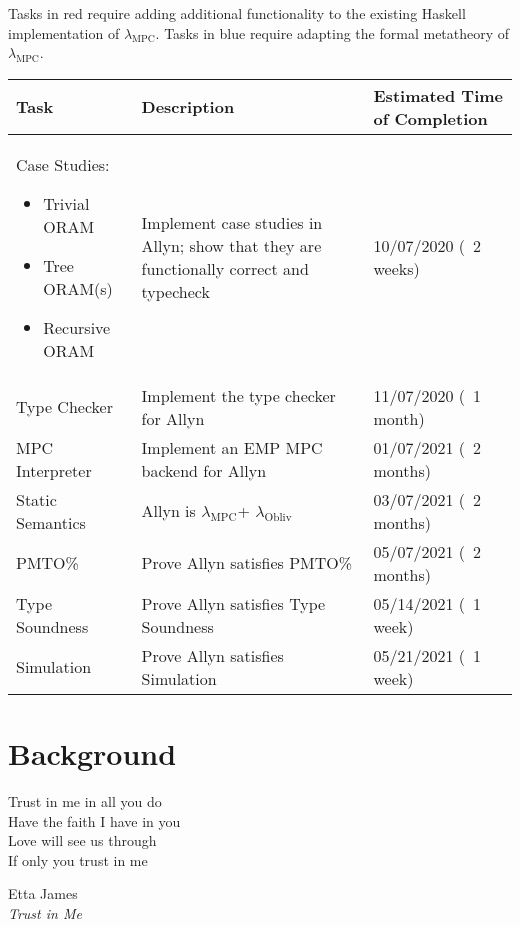 \documentclass{report}
\newcommand{\lang}{Allyn\xspace}
\newcommand{\mpc}{\ensuremath{\lambda_{\mathrm{MPC}}}\xspace}
\newcommand{\obliv}{\ensuremath{\lambda_{\mathrm{Obliv}}}\xspace}
\begin{document}
Tasks in \colorbox{implColor}{red} require adding additional functionality to the existing Haskell implementation of \mpc.
Tasks in \colorbox{theoryColor}{blue} require adapting the formal metatheory of \mpc.

\begin{table}[]
  \begin{tabular}{|p{}|p{}|p{}|}
    \hline
    \textbf{Task} & \textbf{Description} & \textbf{Estimated Time of Completion} \\
    \hline
    \rowcolor{implColor}
    Case Studies:
    \begin{itemize}
    \item Trivial ORAM
    \item Tree ORAM(s)
    \item Recursive ORAM
    \end{itemize}    & Implement case studies in \lang;
                       show that they are functionally correct and typecheck & 10/07/2020 (~2 weeks)  \\ \hline
    \rowcolor{implColor}
    Type Checker     & Implement the type checker for \lang                  & 11/07/2020 (~1 month)  \\ \hline
    \rowcolor{implColor}
    MPC Interpreter  & Implement an EMP MPC backend for \lang                & 01/07/2021 (~2 months) \\ \hline
    \rowcolor{theoryColor}
    Static Semantics & \lang is \mpc + \obliv                                & 03/07/2021 (~2 months) \\ \hline
    \rowcolor{theoryColor}
    PMTO\%           & Prove \lang satisfies PMTO\%                          & 05/07/2021 (~2 months) \\ \hline
    \rowcolor{theoryColor}
    Type Soundness   & Prove \lang satisfies Type Soundness                  & 05/14/2021 (~1 week)   \\ \hline
    \rowcolor{theoryColor}
    Simulation       & Prove \lang satisfies Simulation                      & 05/21/2021 (~1 week)   \\ \hline
  \end{tabular}
\end{table}

\chapter{Background}
\epigraph{Trust in me in all you do \\
          Have the faith I have in you \\
          Love will see us through \\
          If only you trust in me}{
            Etta James \\
            \emph{Trust in Me}}
\end{document}

